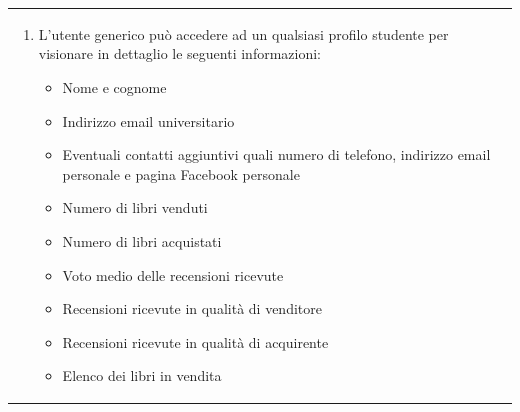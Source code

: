 \documentclass[10pt,a4paper]{report}
\begin{document}
\begin{tabular}{lp{}}
\begin{enumerate}
			\item L'utente generico può accedere ad un qualsiasi profilo studente per visionare in dettaglio le seguenti informazioni:
			\begin{itemize}
				\item Nome e cognome
				\item Indirizzo email universitario
				\item Eventuali contatti aggiuntivi quali numero di telefono, indirizzo email personale e pagina Facebook personale
				\item Numero di libri venduti
				\item Numero di libri acquistati
				\item Voto medio delle recensioni ricevute
				\item Recensioni ricevute in qualità di venditore
				\item Recensioni ricevute in qualità di acquirente
				\item Elenco dei libri in vendita
			\end{itemize}
		\end{enumerate}
	\end{tabular}
\end{document}

